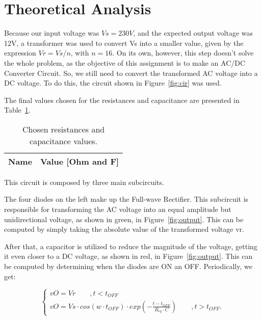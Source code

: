 \section{Theoretical Analysis}
\label{sec:analysis}

Because our input voltage was $Vs = 230V$, and the expected output voltage was 12V, a transformer was used to convert Vs into a smaller value, given by the expression $Vr=Vs/n$, with $n=16$. On its own, however, this step doesn't solve the whole problem, as the objective of this assignment is to make an AC/DC Converter Circuit. So, we still need to convert the transformed AC voltage into a DC voltage. To do this, the circuit shown in Figure~\ref{fig:cir} was used.

The final values chosen for the resistances and capacitance are presented in Table~\ref{tab:val}.

\begin{table}[ht]
  \centering
  \begin{tabular}{|l|r|}
    \hline    
	  {\bf Name} & {\bf Value [Ohm and F]} \\ \hline
        
  \end{tabular}
  \caption{Chosen resistances and capacitance values.}
        \label{tab:val}
\end{table}


This circuit is composed by three main subcircuits. 

The four diodes on the left make up the Full-wave Rectifier. This subcircuit is responsible for transforming the AC voltage into an equal amplitude but unidirectional voltage, as shown in green, in Figure~\ref{fig:output}. This can be computed by simply taking the absolute value of the transformed voltage vr. 

After that, a capacitor is utilized to reduce the magnitude of the voltage, getting it even closer to a DC voltage, as shown in red, in Figure~\ref{fig:output}. This can be computed by determining when the diodes are ON an OFF. Periodically, we get:

\begin{equation}
    \begin{cases}
        vO = Vr \qquad , t < t_{OFF} \\
	    vO = Vs \cdot cos(w \cdot t_{OFF}) \cdot exp(-\frac{t-t_{OFF}}{R_{eq} \cdot C}) \qquad , t > t_{OFF}.
    
  \label{eq:vo}  
  \end{cases}
\end{equation}


